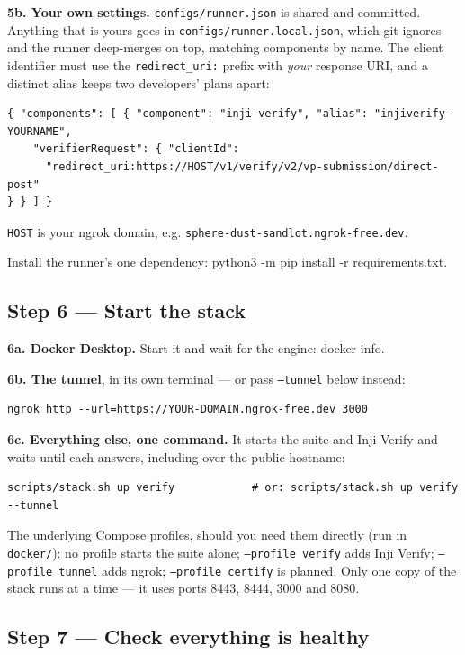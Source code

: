 \documentclass[10pt,a4paper]{article}
\newcommand{\us}{\_}
\newcommand{\cmd}[1]{\colorbox{box}{#1}}
\begin{document}
\textbf{5b. Your own settings.} \texttt{configs/runner.json} is shared and committed. Anything
that is yours goes in \texttt{configs/runner.local.json}, which git ignores and the runner
deep-merges on top, matching components by name. The client identifier must use the
\texttt{redirect\us{}uri:} prefix with \emph{your} response URI, and a distinct alias keeps two
developers' plans apart:

\begin{verbatim}
{ "components": [ { "component": "inji-verify", "alias": "injiverify-YOURNAME",
    "verifierRequest": { "clientId":
      "redirect_uri:https://HOST/v1/verify/v2/vp-submission/direct-post"
} } ] }
\end{verbatim}

\texttt{HOST} is your ngrok domain, e.g. \texttt{sphere-dust-sandlot.ngrok-free.dev}.

Install the runner's one dependency: \cmd{python3 -m pip install -r requirements.txt}.

\subsection{Step 6 --- Start the stack}

\textbf{6a. Docker Desktop.} Start it and wait for the engine: \cmd{docker info}.

\textbf{6b. The tunnel}, in its own terminal --- or pass \texttt{--tunnel} below instead:
\begin{verbatim}
ngrok http --url=https://YOUR-DOMAIN.ngrok-free.dev 3000
\end{verbatim}

\textbf{6c. Everything else, one command.} It starts the suite and Inji Verify and waits until
each answers, including over the public hostname:
\begin{verbatim}
scripts/stack.sh up verify            # or: scripts/stack.sh up verify --tunnel
\end{verbatim}

The underlying Compose profiles, should you need them directly (run in \texttt{docker/}):
no profile starts the suite alone; \texttt{--profile verify} adds Inji Verify;
\texttt{--profile tunnel} adds ngrok; \texttt{--profile certify} is planned. Only one copy of the
stack runs at a time --- it uses ports 8443, 8444, 3000 and 8080.

\subsection{Step 7 --- Check everything is healthy}
\end{document}
